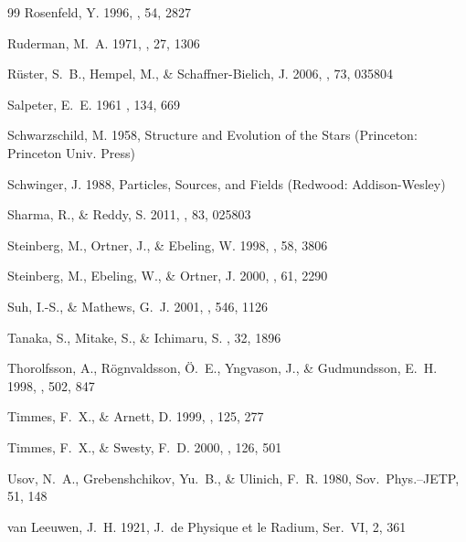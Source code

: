 \documentclass[traditabstract]{aa}
\begin{document}
\begin{thebibliography}{99}
Rosenfeld, Y.
1996,
\pre, 54, 2827

Ruderman, M.~A.
 1971,
\prl, 27, 1306

R\"uster, S.~B., Hempel, M., \& Schaffner-Bielich, J.
2006,
\prc, 73, 035804

Salpeter, E.~E.
1961
\apj, {134}, 669

Schwarzschild, M.
1958,
Structure and Evolution of the Stars
(Princeton: Princeton Univ. Press)

Schwinger, J.
1988,
Particles, Sources, and Fields 
(Redwood: Addison-Wesley)

Sharma, R., \& Reddy, S.
2011,
\prc, 83, 025803

Steinberg, M., Ortner, J., \& Ebeling, W.
1998,
\pre, 58, 3806

Steinberg, M., Ebeling, W., \& Ortner, J.
2000,
\pre, 61, 2290

Suh, I.-S., \& Mathews, G.~J.
2001,
\apj, 546, 1126

Tanaka, S., Mitake, S., \& Ichimaru, S.
\pra, {32}, 1896

Thorolfsson, A., R\"ognvaldsson, \"O.~E., Yngvason, J., \& Gudmundsson, E.~H.
1998,
\apj, 502, 847

Timmes, F.~X., \& Arnett, D.
1999,
\apjs, 125, 277

Timmes, F.~X., \& Swesty, F.~D.
2000,
\apjs, 126, 501

Usov, N.~A., Grebenshchikov, Yu.~B., \& Ulinich, F.~R.
1980,
Sov.\ Phys.--JETP, 51, 148 


van Leeuwen, J.~H.
1921,
J.\ de Physique et le Radium, Ser.\ VI, 2, 361


\end{thebibliography}
\end{document}
